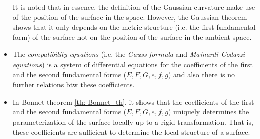 \documentclass[11pt]{article}
\begin{document}
\begin{itemize}
\begin{remark}
It is noted that in essence, the definition of the Gaussian curvature make use of the position of the surface in the space. However, the Gaussian theorem shows that it only depends on the metric structure (i.e. the first fundamental form) of the surface not on the position of the surface in the ambient space. 
\end{remark}

\item  \begin{remark}
The \emph{compatibility equations} (i.e. the \emph{Gauss formula} and \emph{Mainardi-Codazzi equations}) is a system of differential equations for the coefficients of the first and the second fundamental forms ($E,F,G,e,f,g$) and also there is no further relations btw these coefficients.
\end{remark}

\item  \begin{remark}
In Bonnet theorem \ref{th: Bonnet_th}, it shows that the coefficients of the first and the second fundamental forms ($E,F,G,e,f,g$) uniquely determines the parameterization of the surface locally up to a rigid transformation. That is, these coefficients are sufficient to determine the local structure of a surface.  
\end{remark}

\end{itemize}
\end{document}
